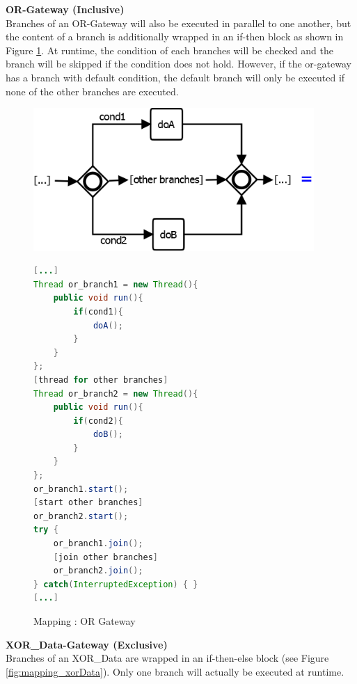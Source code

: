 \textbf{OR-Gateway (Inclusive)}\\
Branches of an OR-Gateway will also be executed in parallel to one another, but the content of a branch is additionally wrapped in an if-then block as shown in Figure \ref{fig:mapping_OR}. At runtime, the condition of each branches will be checked and the branch will be skipped if the condition does not hold. However, if the or-gateway has a branch with default condition, the default branch will only be executed if none of the other branches are executed.
\begin{figure}[h]
\begin{minipage}[c]{0.5\textwidth}
\includegraphics[width=0.95\textwidth]{images/mapping/or-gateway.png}
\end{minipage}
\begin{minipage}[c]{0.5\textwidth}
\begin{lstlisting}[language=Java]
[...]
Thread or_branch1 = new Thread(){
	public void run(){
		if(cond1){
			doA();
		}
	}
};
[thread for other branches]
Thread or_branch2 = new Thread(){
	public void run(){
		if(cond2){
			doB();
		}
	}
};
or_branch1.start();
[start other branches]
or_branch2.start();
try {
	or_branch1.join();
	[join other branches]
	or_branch2.join();
} catch(InterruptedException) { }
[...]
\end{lstlisting}
\end{minipage}
\caption{Mapping : OR Gateway}%
\label{fig:mapping_OR}%
\end{figure}


\textbf{XOR\_Data-Gateway (Exclusive)}\\
Branches of an XOR\_Data are wrapped in an if-then-else block (see Figure \ref{fig:mapping_xorData}). Only one branch will actually be executed at runtime. \\

